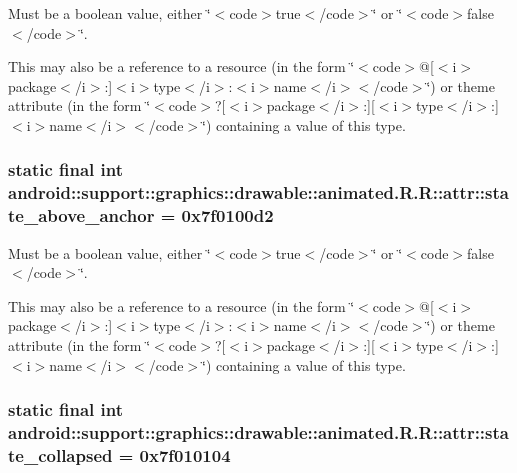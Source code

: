 Must be a boolean value, either \char`\"{}$<$code$>$true$<$/code$>$\char`\"{} or \char`\"{}$<$code$>$false$<$/code$>$\char`\"{}. 

This may also be a reference to a resource (in the form \char`\"{}$<$code$>$@\mbox{[}$<$i$>$package$<$/i$>$:\mbox{]}$<$i$>$type$<$/i$>$:$<$i$>$name$<$/i$>$$<$/code$>$\char`\"{}) or theme attribute (in the form \char`\"{}$<$code$>$?\mbox{[}$<$i$>$package$<$/i$>$:\mbox{]}\mbox{[}$<$i$>$type$<$/i$>$:\mbox{]}$<$i$>$name$<$/i$>$$<$/code$>$\char`\"{}) containing a value of this type. \hypertarget{classandroid_1_1support_1_1graphics_1_1drawable_1_1animated_1_1_r_1_1attr_002313b5ae0f1a59a5f25228a5c62824}{
\subsubsection[{state\_\-above\_\-anchor}]{\setlength{\rightskip}{0pt plus 5cm}static final int android::support::graphics::drawable::animated.R.R::attr::state\_\-above\_\-anchor = 0x7f0100d2}}
\label{classandroid_1_1support_1_1graphics_1_1drawable_1_1animated_1_1_r_1_1attr_002313b5ae0f1a59a5f25228a5c62824}


Must be a boolean value, either \char`\"{}$<$code$>$true$<$/code$>$\char`\"{} or \char`\"{}$<$code$>$false$<$/code$>$\char`\"{}. 

This may also be a reference to a resource (in the form \char`\"{}$<$code$>$@\mbox{[}$<$i$>$package$<$/i$>$:\mbox{]}$<$i$>$type$<$/i$>$:$<$i$>$name$<$/i$>$$<$/code$>$\char`\"{}) or theme attribute (in the form \char`\"{}$<$code$>$?\mbox{[}$<$i$>$package$<$/i$>$:\mbox{]}\mbox{[}$<$i$>$type$<$/i$>$:\mbox{]}$<$i$>$name$<$/i$>$$<$/code$>$\char`\"{}) containing a value of this type. \hypertarget{classandroid_1_1support_1_1graphics_1_1drawable_1_1animated_1_1_r_1_1attr_579a8ec047cb5274d2822eedec4c2285}{
\subsubsection[{state\_\-collapsed}]{\setlength{\rightskip}{0pt plus 5cm}static final int android::support::graphics::drawable::animated.R.R::attr::state\_\-collapsed = 0x7f010104}}
\label{classandroid_1_1support_1_1graphics_1_1drawable_1_1animated_1_1_r_1_1attr_579a8ec047cb5274d2822eedec4c2285}


